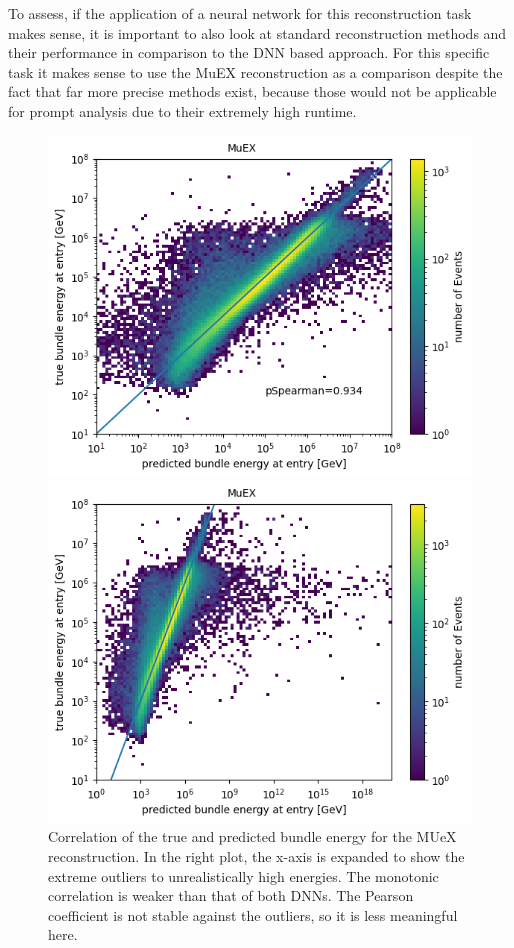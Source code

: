 \documentclass[
  tucolor,       %
  BCOR=12mm,     %
  parskip=half,  %
  open=any,      %
  cleardoublepage=plain,  %
]{tudothesis}
\begin{document}
To assess, if the application of a neural network for this reconstruction task makes sense, it is important to also look at standard reconstruction methods and their performance
in comparison to the DNN based approach. For this specific task it makes sense to use the MuEX reconstruction \cite{20.500.12030_2899} as a comparison despite the fact that far more 
precise methods exist, because those would not be applicable for prompt analysis due to their extremely high runtime.
\begin{figure}
  \centering
  \begin{minipage}[t]{0.49\textwidth}
    \includegraphics[width=\textwidth]{Plots/correlation_bundle_energy_muex}
  \end{minipage}
  \begin{minipage}[t]{0.49\textwidth}
    \includegraphics[width=\textwidth]{Plots/correlation_bundle_energy_muex2}
  \end{minipage}
  \caption{Correlation of the true and predicted bundle energy for the MUeX reconstruction. In the right plot, the x-axis is expanded to show the extreme outliers to unrealistically high energies. The monotonic correlation is weaker than that of both DNNs. The Pearson coefficient is not stable against the outliers, so it is less meaningful here.}
  \label{fig:Correlation MUeX}
\end{figure}
\end{document}
